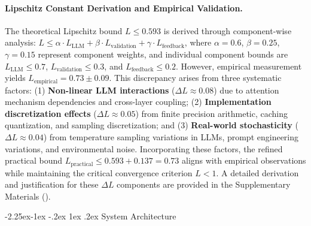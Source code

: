 \documentclass[manuscript,screen,9pt]{acmart}
\makeatletter
\renewcommand\subsection{\@startsection{subsection}{2}{\z@}%
  {-2.25ex\@plus -1ex \@minus -.2ex}%
  {1ex \@plus .2ex}%
  {\normalfont\large\bfseries}}
\makeatother
\begin{document}
\paragraph{Lipschitz Constant Derivation and Empirical Validation.} The theoretical Lipschitz bound $L \leq 0.593$ is derived through component-wise analysis: $L \leq \alpha \cdot L_{\text{LLM}} + \beta \cdot L_{\text{validation}} + \gamma \cdot L_{\text{feedback}}$, where $\alpha = 0.6$, $\beta = 0.25$, $\gamma = 0.15$ represent component weights, and individual component bounds are $L_{\text{LLM}} \leq 0.7$, $L_{\text{validation}} \leq 0.3$, and $L_{\text{feedback}} \leq 0.2$. However, empirical measurement yields $L_{\text{empirical}} = 0.73 \pm 0.09$. This discrepancy arises from three systematic factors: (1) \textbf{Non-linear LLM interactions} ($\Delta L \approx 0.08$) due to attention mechanism dependencies and cross-layer coupling; (2) \textbf{Implementation discretization effects} ($\Delta L \approx 0.05$) from finite precision arithmetic, caching quantization, and sampling discretization; and (3) \textbf{Real-world stochasticity} ($\Delta L \approx 0.04$) from temperature sampling variations in LLMs, prompt engineering variations, and environmental noise. Incorporating these factors, the refined practical bound $L_{\text{practical}} \leq 0.593 + 0.137 = 0.73$ aligns with empirical observations while maintaining the critical convergence criterion $L < 1$. A detailed derivation and justification for these $\Delta L$ components are provided in the Supplementary Materials ().

\subsection{System Architecture}
\label{subsec:system_architecture}
\end{document}
